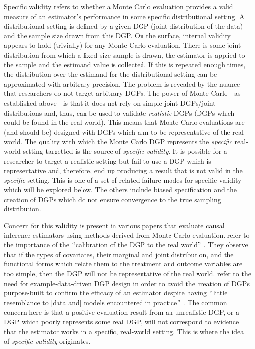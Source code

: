 \documentclass[../main.tex]{subfiles}
\begin{document}
Specific validity refers to whether a Monte Carlo evaluation provides a valid measure of an estimator’s performance in some specific distributional setting. A distributional setting is defined by a given DGP (joint distribution of the data) and the sample size drawn from this DGP. On the surface, internal validity appears to hold (trivially) for any Monte Carlo evaluation. There is some joint distribution from which a fixed size sample is drawn, the estimator is applied to the sample and the estimand value is collected. If this is repeated enough times, the distribution over the estimand for the distributional setting can be approximated with arbitrary precision. The problem is revealed by the nuance that researchers do not target arbitrary DGPs. The power of Monte Carlo - as established above - is that it does not rely on simple joint DGPs/joint distributions and, thus, can be used to validate \textit{realistic} DGPs (DGPs which could be found in the real world). This means that Monte Carlo evaluations are (and should be) designed with DGPs which aim to be representative of the real world. The quality with which the Monte Carlo DGP represents the \textit{specific }real-world setting targetted is the source of \textit{specific validity. }It is possible for a researcher to target a realistic setting but fail to use a DGP which is representative and, therefore, end up producing a result that is not valid in the \textit{specific }setting. This is one of a set of related failure modes for specific validity which will be explored below. The others include biased specification and the creation of DGPs which do not ensure convergence to the true sampling distribution.\par


\vspace{\baselineskip}
Concern for this validity is present in various papers that evaluate causal inference estimators using methods derived from Monte Carlo evaluation. \textcite{Dorie2019Automated1} refer to the importance of the $``$calibration of the DGP to the real world$"$ . They observe that if the types of covariates, their marginal and joint distribution, and the functional forms which relate them to the treatment and outcome variables are too simple, then the DGP will not be representative of the real world. \textcite{Paxton2001MonteImplementation} refer to the need for example-data-driven DGP design in order to avoid the creation of DGPs purpose-built to confirm the efficacy of an estimator despite having $``$little resemblance to [data and] models encountered in practice$"$ . The common concern here is that a positive evaluation result from an unrealistic DGP, or a DGP which poorly represents some real DGP, will not correspond to evidence that the estimator works in a specific, real-world setting. This is where the idea of \textit{specific validity }originates.\par
\end{document}

